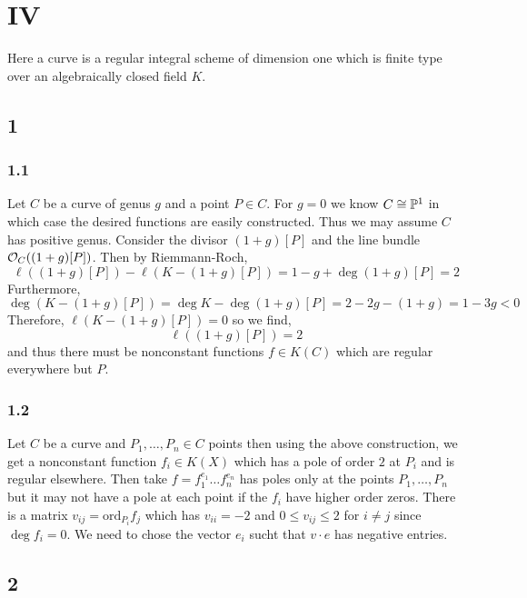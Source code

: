 \documentclass[12pt]{article}
\begin{document}
\section{IV}

\begin{definition}
Here a curve is a regular integral scheme of dimension one which is finite type over an algebraically closed field $K$.
\end{definition}

\subsection{1}

\subsubsection{1.1}

Let $C$ be a curve of genus $g$ and a point $P \in C$. For $g = 0$ we know $C \cong \P^1$ in which case the desired functions are easily constructed. Thus we may assume $C$ has positive genus. Consider the divisor $(1 + g)[P]$ and the line bundle $\struct{C}((1 + g)[P])$. Then by Riemmann-Roch,
\[ \ell((1 + g)[P]) - \ell(K - (1 + g)[P]) = 1 - g + \deg{(1 + g) [P]} = 2 \]
Furthermore,
\[ \deg{(K - (1+g)[P])} = \deg{K} - \deg{(1 + g)[P]} = 2 - 2g - (1 + g) = 1 - 3 g < 0 \]
Therefore, $\ell(K - (1 + g)[P]) = 0$ so we find,
\[ \ell((1 + g)[P]) = 2 \]
and thus there must be nonconstant functions $f \in K(C)$ which are regular everywhere but $P$. 

\subsubsection{1.2}

Let $C$ be a curve and $P_1, \dots, P_n \in C$ points then using the above construction, we get a nonconstant function $f_i \in K(X)$ which has a pole of order $2$ at $P_i$ and is regular elsewhere. Then take $f = f_1^{e_1} \dots f_n^{e_n}$ has poles only at the points $P_1, \dots, P_n$ but it may not have a pole at each point if the $f_i$ have higher order zeros. There is a matrix $v_{ij} = \mathrm{ord}_{P_i} f_j$ which has $v_{ii} = -2$ and $0 \le v_{ij} \le 2$ for $i \neq j$ since $\deg{f_i} = 0$. We need to chose the vector $e_i$ sucht that $v \cdot e$ has negative entries. 

\subsection{2}
\end{document}
